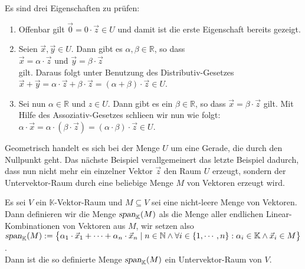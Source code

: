 \proof
Es sind drei Eigenschaften zu pr\"{u}fen:
\begin{enumerate}
\item Offenbar gilt $\vec{0} = 0 \cdot \vec{z} \in U$ und damit ist die erste Eigenschaft bereits gezeigt.
\item Seien $\vec{x}, \vec{y} \in U$.  Dann gibt es $\alpha, \beta \in \mathbb{R}$, so dass
      \\[0.2cm]
      \hspace*{1.3cm}
      $\vec{x} = \alpha \cdot \vec{z}$ \quad und \quad $\vec{y} = \beta \cdot \vec{z}$
      \\[0.2cm]
      gilt.  Daraus folgt unter Benutzung des Distributiv-Gesetzes
      \\[0.2cm]
      \hspace*{1.3cm}
      $\vec{x} + \vec{y} = \alpha \cdot \vec{z} + \beta \cdot \vec{z} = (\alpha + \beta) \cdot \vec{z} \in U$.
\item Sei nun $\alpha \in \mathbb{R}$ und $z \in U$.  Dann gibt es ein $\beta \in \mathbb{R}$, so dass
      $\vec{x} = \beta \cdot \vec{z}$ gilt.  Mit Hilfe des Assoziativ-Gesetzes schlie\3en wir nun wie folgt:
      \\[0.2cm]
      \hspace*{1.3cm}
      $\alpha \cdot \vec{x} = \alpha \cdot (\beta \cdot \vec{z}) = (\alpha \cdot \beta) \cdot \vec{z} \in U$.
      \qeds
\end{enumerate}

\remark
Geometrisch handelt es sich bei der Menge $U$ um eine Gerade, die durch den Nullpunkt geht.
Das n\"{a}chste Beispiel verallgemeinert das letzte Beispiel dadurch, dass nun nicht mehr ein einzelner Vektor
$\vec{z}$ den Raum $U$ erzeugt, sondern der Untervektor-Raum durch eine beliebige Menge $M$ von Vektoren
erzeugt wird.

\example
Es sei $V$ ein $\mathbb{K}$-Vektor-Raum und $M \subseteq V$ sei eine nicht-leere Menge von Vektoren.  Dann definieren wir die Menge
$\textsl{span}_\mathbb{K}(M)$ als die Menge aller endlichen Linear-Kombinationen von Vektoren aus $M$, wir setzen also
\\[0.2cm]
\hspace*{1.3cm}
$\textsl{span}_\mathbb{K}(M) := 
 \bigl\{ \alpha_1 \cdot \vec{x}_1 + \cdots + \alpha_n \cdot \vec{x}_n \mid n \in \mathbb{N} \wedge \forall i \in
 \{1,\cdots,n\}:\alpha_i \in \mathbb{K} \wedge \vec{x}_i \in M \bigr\}
$.
\\[0.2cm]
Dann ist die so definierte Menge $\textsl{span}_\mathbb{K}(M)$ ein Untervektor-Raum von $V$.

